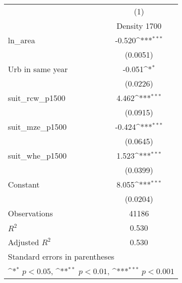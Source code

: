 {
\def\sym#1{\ifmmode^{#1}\else\(^{#1}\)\fi}
\begin{tabular}{l*{1}{c}}
\toprule
                    &\multicolumn{1}{c}{(1)}\\
                    &\multicolumn{1}{c}{Density 1700}\\
\midrule
ln\_area             &      -0.520\sym{***}\\
                    &    (0.0051)         \\
\addlinespace
Urb in same year    &      -0.051\sym{*}  \\
                    &    (0.0226)         \\
\addlinespace
suit\_rcw\_p1500      &       4.462\sym{***}\\
                    &    (0.0915)         \\
\addlinespace
suit\_mze\_p1500      &      -0.424\sym{***}\\
                    &    (0.0645)         \\
\addlinespace
suit\_whe\_p1500      &       1.523\sym{***}\\
                    &    (0.0399)         \\
\addlinespace
Constant            &       8.055\sym{***}\\
                    &    (0.0204)         \\
\midrule
Observations        &       41186         \\
\(R^{2}\)           &       0.530         \\
Adjusted \(R^{2}\)  &       0.530         \\
\bottomrule
\multicolumn{2}{l}{\footnotesize Standard errors in parentheses}\\
\multicolumn{2}{l}{\footnotesize \sym{*} \(p<0.05\), \sym{**} \(p<0.01\), \sym{***} \(p<0.001\)}\\
\end{tabular}
}
